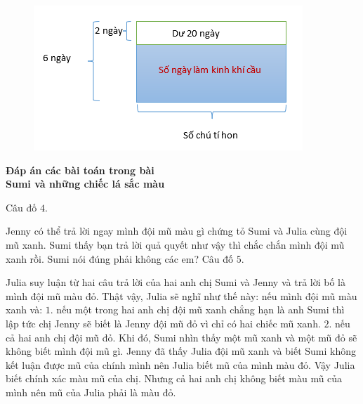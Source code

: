 \begin{figure}[H]
	\centering
	\vspace*{-5pt}
	\captionsetup{labelformat= empty, justification=centering}
	\includegraphics[width=0.85\linewidth]{16}
	\vspace*{-15pt}
\end{figure}
\newpage
\begin{center}
	{}
\end{center}
\begin{center}
	\textbf{\color{toancuabi}Đáp án các bài toán trong bài\\ Sumi và những chiếc lá sắc màu}
\end{center}
Câu đố $4$. %

Jenny có thể trả lời ngay mình đội mũ màu gì chứng tỏ Sumi và Julia cùng đội mũ xanh. Sumi thấy bạn trả lời quả quyết như vậy thì chắc chắn mình đội mũ xanh rồi. Sumi nói đúng phải không các em?
\vskip 0.1cm
Câu đố $5$. %

Julia suy luận từ hai câu trả lời của hai anh chị Sumi và Jenny và trả lời bố là mình đội mũ màu đỏ. Thật vậy, Julia sẽ nghĩ như thế này: nếu mình đội mũ màu xanh và:
\vskip 0.1cm
$1.$ nếu một trong hai anh chị đội mũ xanh chẳng hạn là anh Sumi thì lập tức chị Jenny sẽ biết là Jenny đội mũ đỏ vì chỉ có hai chiếc mũ xanh.
\vskip 0.1cm
$2.$  nếu cả hai anh chị đội mũ đỏ. Khi đó, Sumi nhìn thấy một mũ xanh và một mũ đỏ sẽ không biết mình đội mũ gì. Jenny đã thấy Julia đội mũ xanh và biết Sumi không kết luận được mũ của chính mình nên Julia biết mũ của mình màu đỏ. Vậy Julia biết chính xác màu mũ của chị.
\vskip 0.1cm
Nhưng cả hai anh chị không biết màu mũ của mình nên mũ của Julia phải là màu đỏ.

